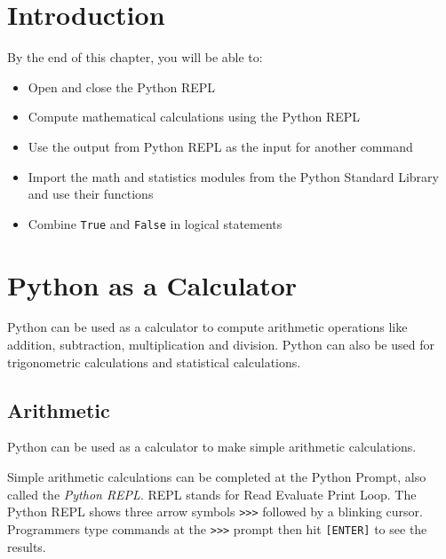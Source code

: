 \documentclass{book}
\begin{document}
    
        \section{Introduction}\label{introduction}
    




    
        By the end of this chapter, you will be able to:

\begin{itemize}
\item
  Open and close the Python REPL
\item
  Compute mathematical calculations using the Python REPL
\item
  Use the output from Python REPL as the input for another command
\item
  Import the math and statistics modules from the Python Standard
  Library and use their functions
\item
  Combine \lstinline!True! and \lstinline!False! in logical statements
\end{itemize}
        \newpage



    




    
        \section{Python as a Calculator}\label{python-as-a-calculator}
    




    
        Python can be used as a calculator to compute arithmetic operations like
addition, subtraction, multiplication and division. Python can also be
used for trigonometric calculations and statistical calculations.
    




    
        \subsection{Arithmetic}\label{arithmetic}

Python can be used as a calculator to make simple arithmetic
calculations.

Simple arithmetic calculations can be completed at the Python Prompt,
also called the \emph{Python REPL}. REPL stands for Read Evaluate Print
Loop. The Python REPL shows three arrow symbols \lstinline!>>>! followed
by a blinking cursor. Programmers type commands at the \lstinline!>>>!
prompt then hit \lstinline![ENTER]! to see the results.
\end{document}
